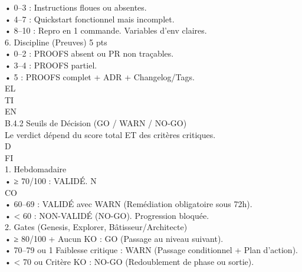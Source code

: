 \documentclass[12pt,landscape,a4paper]{article}
\begin{document}
• 0–3 : Instructions floues ou absentes.\\
• 4–7 : Quickstart fonctionnel mais incomplet.\\
• 8–10 : Repro en 1 commande. Variables d’env claires.\\
\vspace{0.5em}
6. Discipline (Preuves)           5 pts\\
• 0–2 : PROOFS absent ou PR non traçables.\\
• 3–4 : PROOFS partiel.\\
• 5 : PROOFS complet + ADR + Changelog/Tags.\\
\vspace{0.5em}
\vspace{0.5em}
\vspace{0.5em}
\vspace{0.5em}
EL\\
TI\\
EN\\
B.4.2 Seuils de Décision (GO / WARN / NO-GO)\\
Le verdict dépend du score total ET des critères critiques.\\
\vspace{0.5em}
\vspace{0.5em}
\vspace{0.5em}
\vspace{0.5em}
D\\
FI\\
1. Hebdomadaire\\
\vspace{0.5em}
• ≥ 70/100 : VALIDÉ.                           N\\
CO\\
• 60–69 : VALIDÉ avec WARN (Remédiation obligatoire sous 72h).\\
\vspace{0.5em}
• \textless{} 60 : NON-VALIDÉ (NO-GO). Progression bloquée.\\
\vspace{0.5em}
2. Gates (Genesis, Explorer, Bâtisseur/Architecte)\\
\vspace{0.5em}
• ≥ 80/100 + Aucun KO : GO (Passage au niveau suivant).\\
\vspace{0.5em}
• 70–79 ou 1 Faiblesse critique : WARN (Passage conditionnel + Plan d’action).\\
\vspace{0.5em}
• \textless{} 70 ou Critère KO : NO-GO (Redoublement de phase ou sortie).\\
\end{document}
